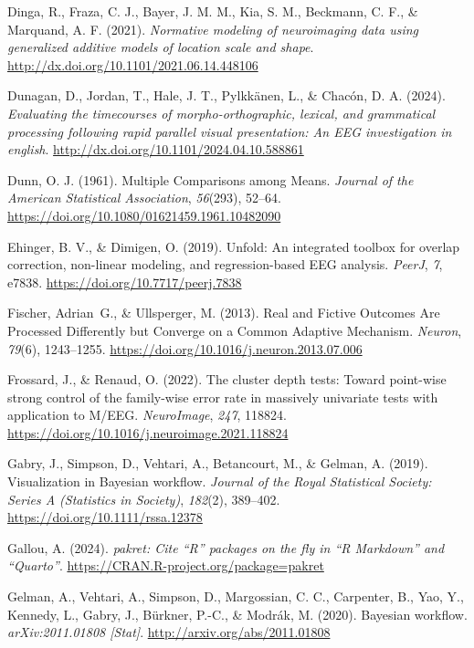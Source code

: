 \documentclass[
  doc,
  floatsintext,
  longtable,
  a4paper,
  nolmodern,
  notxfonts,
  notimes,
  donotrepeattitle,
  colorlinks=true,linkcolor=blue,citecolor=blue,urlcolor=blue]{apa7}
\newlength{\cslhangindent}
\newenvironment{CSLReferences}[2] %
 {\begin{list}{}{%
  \setlength{\itemindent}{0pt}
  \setlength{\leftmargin}{0pt}
  \setlength{\parsep}{0pt}
  \ifodd #1
   \setlength{\leftmargin}{\cslhangindent}
   \setlength{\itemindent}{-1\cslhangindent}
  \fi
  \setlength{\itemsep}{#2\baselineskip}}}
 {\end{list}}
\begin{document}
\begin{CSLReferences}{1}{0}
Dinga, R., Fraza, C. J., Bayer, J. M. M., Kia, S. M., Beckmann, C. F.,
\& Marquand, A. F. (2021). \emph{Normative modeling of neuroimaging data
using generalized additive models of location scale and shape}.
\url{http://dx.doi.org/10.1101/2021.06.14.448106}

Dunagan, D., Jordan, T., Hale, J. T., Pylkkänen, L., \& Chacón, D. A.
(2024). \emph{Evaluating the timecourses of morpho-orthographic,
lexical, and grammatical processing following rapid parallel visual
presentation: An EEG investigation in english}.
\url{http://dx.doi.org/10.1101/2024.04.10.588861}

Dunn, O. J. (1961). Multiple Comparisons among Means. \emph{Journal of
the American Statistical Association}, \emph{56}(293), 52--64.
\url{https://doi.org/10.1080/01621459.1961.10482090}

Ehinger, B. V., \& Dimigen, O. (2019). Unfold: An integrated toolbox for
overlap correction, non-linear modeling, and regression-based {EEG}
analysis. \emph{PeerJ}, \emph{7}, e7838.
\url{https://doi.org/10.7717/peerj.7838}

Fischer, Adrian~G., \& Ullsperger, M. (2013). Real and Fictive Outcomes
Are Processed Differently but Converge on a Common Adaptive Mechanism.
\emph{Neuron}, \emph{79}(6), 1243--1255.
\url{https://doi.org/10.1016/j.neuron.2013.07.006}

Frossard, J., \& Renaud, O. (2022). The cluster depth tests: Toward
point-wise strong control of the family-wise error rate in massively
univariate tests with application to M/EEG. \emph{NeuroImage},
\emph{247}, 118824.
\url{https://doi.org/10.1016/j.neuroimage.2021.118824}

Gabry, J., Simpson, D., Vehtari, A., Betancourt, M., \& Gelman, A.
(2019). Visualization in Bayesian work{fl}ow. \emph{Journal of the Royal
Statistical Society: Series A (Statistics in Society)}, \emph{182}(2),
389--402. \url{https://doi.org/10.1111/rssa.12378}

Gallou, A. (2024). \emph{{pakret}: Cite {``{R}''} packages on the fly in
{``{R Markdown}''} and {``{Quarto}''}}.
\url{https://CRAN.R-project.org/package=pakret}

Gelman, A., Vehtari, A., Simpson, D., Margossian, C. C., Carpenter, B.,
Yao, Y., Kennedy, L., Gabry, J., Bürkner, P.-C., \& Modrák, M. (2020).
Bayesian workflow. \emph{arXiv:2011.01808 {[}Stat{]}}.
\url{http://arxiv.org/abs/2011.01808}


\end{CSLReferences}
\end{document}
